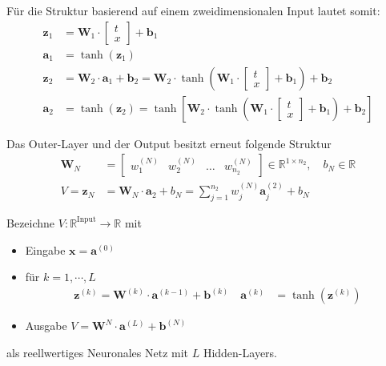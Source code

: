 \documentclass[a4paper, 12pt]{scrartcl}
\begin{document}
Für die Struktur basierend auf einem zweidimensionalen Input lautet somit: 
\begin{align*}
    \bm{z}_1 
    &=
    \bm{W}_1
    \cdot
    \begin{bmatrix}
        t \\ x
    \end{bmatrix}
    +
    \bm{b}_1
    \\
    \bm{a}_1
    &=
    \tanh(\bm{z}_1)
    \\
    \bm{z}_2
    &=
    \bm{W}_2 
    \cdot 
    \bm{a}_1
    + 
    \bm{b}_2
    =
    \bm{W}_2 \cdot 
    \tanh
    \left(
        \bm{W}_1 \cdot  
        \begin{bmatrix}
            t \\ x
        \end{bmatrix}
        +
        \bm{b}_1
    \right)
    +
    \bm{b}_2
    \\
    \bm{a}_2
    &=
    \tanh(\bm{z}_2)
    =
    \tanh
    \left[
        \bm{W}_2 \cdot
        \tanh
        \left(
            \bm{W}_1
            \cdot
            \begin{bmatrix}
                t \\ x
            \end{bmatrix}
            + 
            \bm{b}_1
        \right)
        +
        \bm{b}_2
    \right]
\end{align*}

Das Outer-Layer und der Output besitzt erneut folgende Struktur
%
\begin{align*}
    \bm{W}_{N}
    &=
    \begin{bmatrix}
        w_{1}^{(N)} & w_{2}^{(N)} & \ldots & w_{n_2}^{(N)}
    \end{bmatrix}
    \in \mathbb{R}^{1 \times n_2},
    \quad
    b_{N}
    \in \mathbb{R}
    \\
    V =
    \bm{z}_N
    &=
    \bm{W}_N \cdot \bm{a}_2 + b_N
    =
    \sum_{j=1}^{n_2} w_j^{(N)} \bm{a}_{j}^{(2)} + b_N
\end{align*}

\begin{definition}
    Bezeichne $V :\mathbb{R}^{\text{Input}} \to \mathbb{R}$ mit 
    \begin{itemize}
        \item Eingabe $\bm{x} = \bm{a}^{(0)}$
        \item für $k=1, \cdots , L$
        \begin{align*}
            \bm{z}^{(k)} = \bm{W}^{(k)} \cdot \bm{a}^{(k-1)} + \bm{b}^{(k)}
            \quad
            \bm{a}^{(k)}  &= \tanh\left( \bm{z}^{(k)} \right)
        \end{align*}

        \item Ausgabe $V =\bm{W}^{N} \cdot \bm{a}^{(L)} + \bm{b}^{(N)}$
    \end{itemize}
    als reellwertiges Neuronales Netz mit $L$ Hidden-Layers.
\end{definition}
\end{document}
